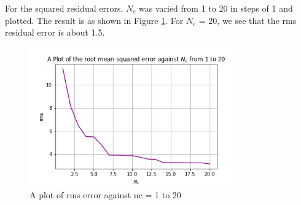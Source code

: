 \documentclass[11pt]{article}
\begin{document}
For the squared residual errors, $N_{c}$ was varied from 1 to 20 in steps of 1 and plotted. The result is as shown in Figure \ref{fig:rms_vs_nc}. For $N_{c}$ = 20, we see that the rms residual error is about 1.5.

	\begin{figure}[!htb]\begin{center} 
		\vspace{12pt}
		\includegraphics[width=0.8\textwidth]{rms_vs_nc.png}
		\caption{A plot of rms error against nc = 1 to 20}
		\label{fig:rms_vs_nc} 
	\end{center}
\end{figure}
	
\end{document}

